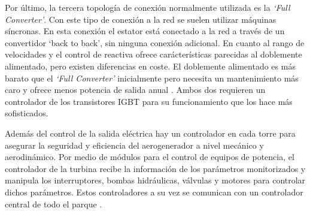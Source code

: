 \documentclass{book}
\begin{document}
		Por \'ultimo, la tercera topolog\'ia de conexi\'on normalmente utilizada es la \emph{‘Full Converter’}. Con este tipo de conexi\'on a la red se suelen utilizar m\'aquinas s\'incronas. En esta conexi\'on el estator est\'a conectado a la red a trav\'es de un convertidor ‘back to back’, sin ninguna conexi\'on adicional. En cuanto al rango de velocidades y el control de reactiva ofrece car\'acter\'isticas parecidas al doblemente alimentado, pero existen diferencias en coste. El doblemente alimentado es m\'as barato que el \emph{‘Full Converter’} inicialmente pero necesita un mantenimiento m\'as caro y ofrece menos potencia de salida anual \cite{PMGvsDFIG}. Ambos dos requieren un controlador de los transistores IGBT para su funcionamiento que los hace m\'as sofisticados.  \par
		Adem\'as del control de la salida el\'ectrica hay un controlador en cada torre para asegurar la seguridad y eficiencia del aerogenerador a nivel mec\'anico y aerodin\'amico. Por medio de m\'odulos para el control de equipos de potencia, el controlador de la turbina recibe la informaci\'on de los par\'ametros monitorizados y manipula los interruptores, bombas hidr\'aulicas, v\'alvulas y motores para controlar dichos par\'ametros. Estos controladores a su vez se comunican con un controlador central de todo el parque \cite{ComunicationControl}.  \par
\end{document}
